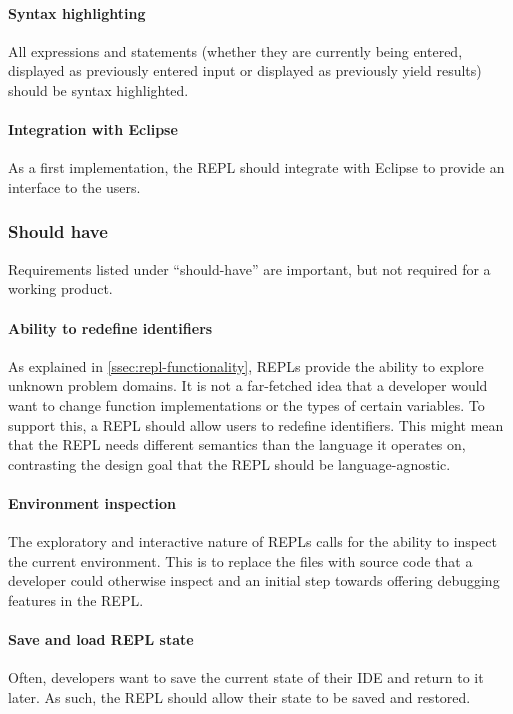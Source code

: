\paragraph{Syntax highlighting} All expressions and statements (whether they are
currently being entered, displayed as previously entered input or displayed as
previously yield results) should be syntax highlighted.

\paragraph{Integration with Eclipse} As a first implementation, the REPL should
integrate with Eclipse to provide an interface to the users.

\subsubsection{Should have}

Requirements listed under ``should-have'' are important, but not required for
a working product.

\paragraph{Ability to redefine identifiers} As explained in \cref{ssec:repl-functionality},
REPLs provide the ability to explore unknown problem domains. It is not a
far-fetched idea that a developer would want to change function implementations
or the types of certain variables. To support this, a REPL should allow users to
redefine identifiers. This might mean that the REPL needs different semantics
than the language it operates on, contrasting the design goal that the REPL
should be language-agnostic.

\paragraph{Environment inspection} The exploratory and interactive nature of
REPLs calls for the ability to inspect the current environment. This is to
replace the files with source code that a developer could otherwise inspect and
an initial step towards offering debugging features in the REPL.

\paragraph{Save and load REPL state} Often, developers want to save the current
state of their IDE and return to it later. As such, the REPL should allow their
state to be saved and restored.

